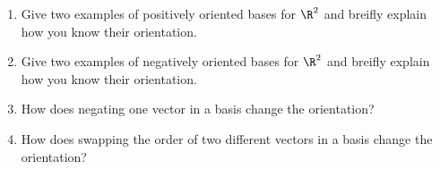 \begin{exercises}
\begin{problist}
		\prob
		\begin{enumerate}
			\item Give two examples of positively oriented bases for
				$\R^{2}$ and breifly explain how you know their orientation.

			\item Give two examples of negatively oriented bases for
				$\R^{2}$ and breifly explain how you know their orientation.

			\item How does negating one vector in a basis change the
				orientation?

			\item How does swapping the order of two different vectors
				in a basis change the orientation?
		\end{enumerate}
	\end{problist}
\end{exercises}
